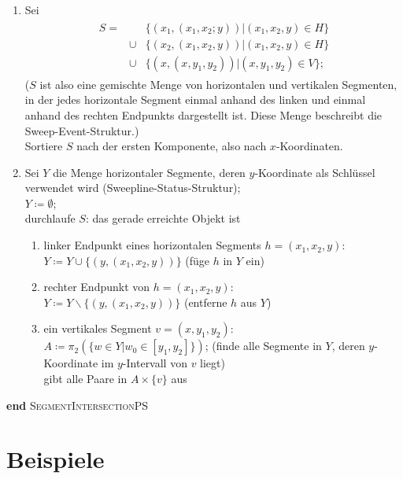 \documentclass[ngerman,draft,parskip=half*,twoside]{scrreprt}
\theoremstyle{break}
\theoremstyle{nonumberbreak}
\begin{document}
\begin{enumerate}
\item
Sei \begin{gather*}
  \begin{array}{rcl}
  S =&& \{(x_1, (x_1,x_2;y)) | (x_1,x_2,y)\in H\}\\
  &\cup& \{(x_2,(x_1,x_2,y)) | (x_1,x_2,y)\in H\}\\
  &\cup& \{(x,(x,y_1,y_2)) | (x,y_1,y_2)\in V\};
\end{array}
\end{gather*}
($S$ ist also eine gemischte Menge von horizontalen und vertikalen Segmenten,
in der jedes horizontale Segment einmal anhand des linken und einmal
anhand des rechten Endpunkts dargestellt ist. Diese Menge beschreibt die
Sweep-Event-Struktur.)\\
Sortiere $S$ nach der ersten Komponente, also nach $x$-Koordinaten.

\item
Sei $Y$ die Menge horizontaler Segmente, deren $y$-Koordinate als
Schlüssel verwendet wird (Sweepline-Status-Struktur);\\
$Y\coloneqq\emptyset$;\\
durchlaufe $S$: das gerade erreichte Objekt ist
\begin{enumerate}
\item
linker Endpunkt eines horizontalen Segments $h=(x_1,x_2,y)$:\\
$Y \coloneqq Y \cup \{(y,(x_1,x_2,y))\}$ (füge $h$ in $Y$ ein)
\item
rechter Endpunkt von $h=(x_1,x_2,y)$:\\
$Y \coloneqq Y \backslash \{(y,(x_1,x_2,y))\}$ (entferne $h$ aus $Y$)
\item
ein vertikales Segment $v=(x,y_1,y_2)$:\\
$A \coloneqq\pi_2 (\{w\in Y | w_0 \in [y_1,y_2] \})$;
 \hspace{1cm}  (finde alle Segmente in $Y$, deren
   $y$-Koordinate im $y$-Intervall von $v$ liegt)\\
gibt alle Paare in $A\times\{v\}$ aus
\end{enumerate}
\end{enumerate}
\textbf{end} \textsc{SegmentIntersectionPS} 

\chapter{Beispiele}
\end{document}
